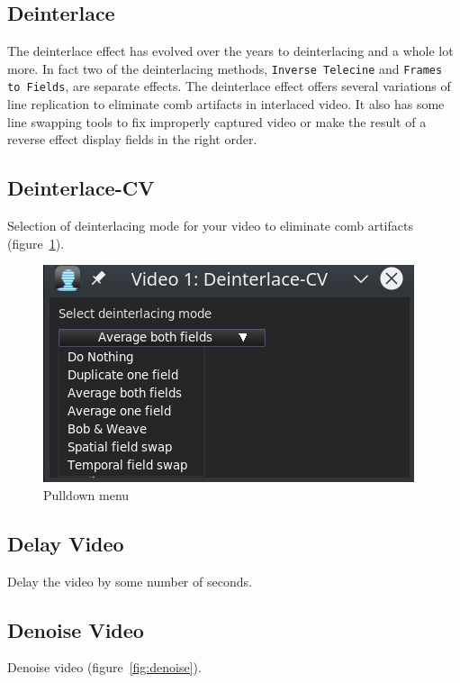 \subsection{Deinterlace}%
\label{sub:deinterlace}

The deinterlace effect has evolved over the years to deinterlacing and a whole lot more. In fact two of the deinterlacing methods, \texttt{Inverse Telecine} and \texttt{Frames to Fields}, are separate effects. The deinterlace effect offers several variations of line replication to eliminate comb artifacts in interlaced video. It also has some line swapping tools to fix improperly captured video or make the result of a reverse effect display fields in the right order.

\subsection{Deinterlace-CV}%
\label{sub:deinterlace_cv}

Selection of deinterlacing mode for your video to eliminate comb artifacts (figure~\ref{fig:deinterlace}).

\begin{figure}[htpb]
    \centering
    \includegraphics[width=0.7\linewidth]{images/deinterlace.png}
    \caption{Pulldown menu}
    \label{fig:deinterlace}
\end{figure}

\subsection{Delay Video}%
\label{sub:delay_video}

Delay the video by some number of seconds.

\subsection{Denoise Video}%
\label{sub:denoise_video}

Denoise video (figure~\ref{fig:denoise}).

